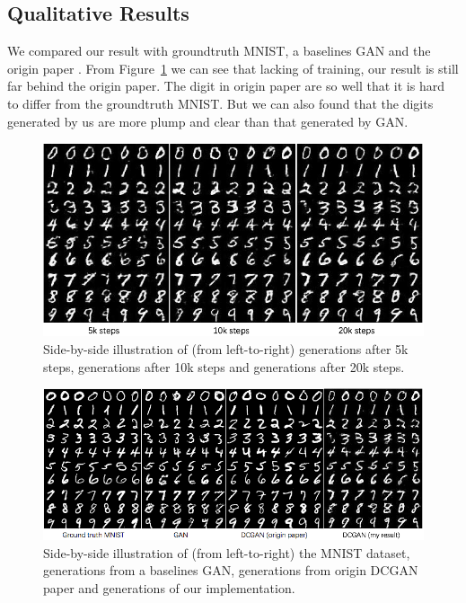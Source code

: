 \subsection{Qualitative Results}
We compared our result with groundtruth MNIST, a baselines GAN and the origin paper \cite{DCGAN}. From Figure~\ref{compare} we can see that lacking of training, our result is still far behind the origin paper. The digit in origin paper are so well that it is hard to differ from the groundtruth MNIST. But we can also found that the digits generated by us are more plump and clear than that generated by GAN.

\begin{figure}
\begin{center}
\includegraphics[width=\textwidth]{figures/steps}
\caption{\label{compare} Side-by-side illustration of (from left-to-right) generations after 5k steps, generations after 10k steps and generations after 20k steps.}
\end{center}
\vspace{-0.45cm}
\end{figure}

\begin{figure}
\begin{center}
\includegraphics[width=\textwidth]{figures/compare}
\caption{\label{steps} Side-by-side illustration of (from left-to-right) the MNIST dataset, generations from a baselines GAN, generations from origin DCGAN \cite{DCGAN} paper and generations of our implementation.}
\end{center}
\vspace{-0.45cm}
\end{figure}




